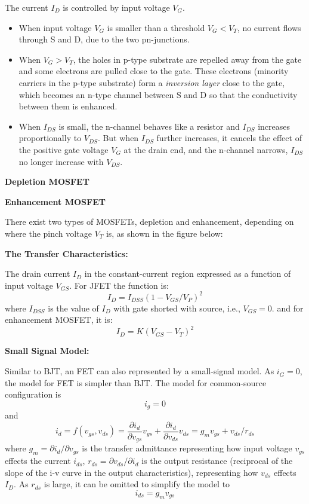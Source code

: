\begin{itemize}
The current $I_D$ is controlled by input voltage $V_G$. 
\begin{itemize}
\item When input voltage $V_G$ is smaller than a threshold $V_G<V_T$, no 
	current flows through S and D, due to the two pn-junctions.
\item When $V_G>V_T$, the holes in p-type substrate are repelled away from
	the gate and some electrons are pulled close to the gate. These
	electrons (minority carriers in the p-type substrate) form a 
	{\em inversion layer} close to the gate, which becomes an n-type 
	channel between S and D so that the conductivity between them is 
	enhanced. 
\item When $I_{DS}$ is small, the n-channel behaves like a resistor and 
	$I_{DS}$ increases proportionally to $V_{DS}$. But when $I_{DS}$ 
	further increases, it cancels the effect of the positive gate 
	voltage $V_G$ at the drain end, and the n-channel narrows, $I_{DS}$
	no longer increase with $V_{DS}$.
\end{itemize}


{\bf Depletion MOSFET}

{\bf Enhancement MOSFET}

There exist two types of MOSFETs, depletion and enhancement, depending on
where the pinch voltage $V_T$ is, as shown in the figure below:


\end{itemize}

{\bf The Transfer Characteristics:}

The drain current $I_D$ in the constant-current region expressed as a 
function of input voltage $V_{GS}$. For JFET the function is:
\[ I_D=I_{DSS}(1-V_{GS}/V_P)^2	\]
where $I_{DSS}$ is the value of $I_D$ with gate shorted with source,
i.e., $V_{GS}=0$.
and for enhancement MOSFET, it is:
\[ I_D=K(V_{GS}-V_T)^2	\]

{\bf Small Signal Model:}

Similar to BJT, an FET can also represented by a small-signal model. As
$i_G=0$, the model for FET is simpler than BJT. The model for common-source
configuration is
\[	i_g=0	\]
and
\[	i_d=f(v_{gs}, v_{ds})=\frac{\partial i_d}{\partial v_{gs}} v_{gs}
	+\frac{\partial i_d}{\partial v_{ds}} v_{ds}
	=g_m v_{gs}+v_{ds}/r_{ds}
\]
where $g_m=\partial i_d/\partial v_{gs}$ is the transfer admittance
representing how input voltage $v_{gs}$ effects the current $i_{ds}$,
$r_{ds}=\partial v_{ds}/\partial i_d$ is the output resistance (reciprocal 
of the slope of the i-v curve in the output characteristics), representing
how $v_{ds}$ effects $I_D$. As $r_{ds}$ is large, it can be omitted to 
simplify the model to 
\[	i_{ds}=g_m v_{gs}	\]

